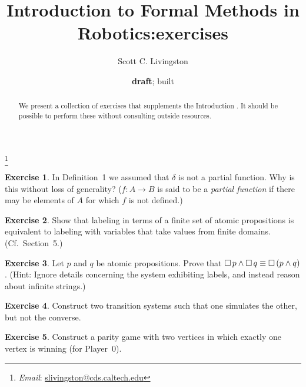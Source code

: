 \documentclass{amsart}
\theoremstyle{definition}
\newtheorem{exer}{Exercise}
\begin{document}
\title{Introduction to Formal Methods in Robotics:\linebreak exercises}
\author{Scott C. Livingston}
\thanks{\textit{Email}: \href{mailto:slivingston@cds.caltech.edu}{slivingston@cds.caltech.edu}}
\date{\textbf{draft}; built \now}
\begin{abstract}
We present a collection of exercises that supplements the Introduction
\cite{ifmr2014}.  It should be possible to perform these without consulting
outside resources.
\end{abstract}
\maketitle


\begin{exer}
In Definition~1 we assumed that $\delta$ is not a partial function.  Why is this
without loss of generality?  ($f:A\rightarrow B$ is said to be a \textit{partial
  function} if there may be elements of $A$ for which $f$ is not defined.)
\end{exer}

\begin{exer}
Show that labeling in terms of a finite set of atomic propositions is equivalent
to labeling with variables that take values from finite domains.
(Cf.\ Section~5.)
\end{exer}

\begin{exer}
Let $p$ and $q$ be atomic propositions.  Prove that $\operatorname{\Box} p \wedge \operatorname{\Box} q \equiv  \operatorname{\Box} \left( p \wedge q \right)$.  (Hint: Ignore details concerning the system exhibiting labels, and instead reason about infinite strings.)
\end{exer}

\begin{exer}
Construct two transition systems such that one simulates the other, but not the converse.
\end{exer}

\begin{exer}
Construct a parity game with two vertices in which exactly one vertex is winning
(for Player~0).
\end{exer}




\end{document}
